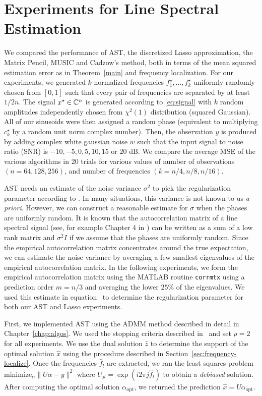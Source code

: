 
\section{Experiments for Line Spectral Estimation} %
\label{sec:ast:experiments}
We compared the performance of AST, the discretized Lasso approximation, the
Matrix Pencil, MUSIC and Cadzow's method, both in terms of the mean squared
estimation error as in Theorem~\ref{main} and frequency localization. For our
experiments, we generated $k$ normalized frequencies $f_1^\star, \ldots,
f_k^\star$ uniformly randomly chosen from $\left[0,1\right]$ such that every
pair of frequencies are separated by at least $1/2n$. The signal $x^\star \in
\mathbb{C}^n$ is generated according to \eqref{eq:signal} with $k$ random amplitudes
independently chosen from $\chi^2(1)$ distribution (squared Gaussian). All of
our sinusoids were then assigned a random phase (equivalent to multiplying
$c_k^\star$ by a random unit norm complex number). Then, the observation $y$ is
produced by adding complex white gaussian noise $w$ such that the input signal
to noise ratio (SNR) is $-10,-5,0,5,10,15$ or $20$ dB. We compare the average
MSE of the various algorithms in 20 trials for various values of number of
observations $(n = 64,128,256)$, and number of frequencies $ (k =
n/4,n/8,n/16)$.


AST needs an estimate of the noise variance $\sigma^2$ to pick the
regularization parameter according to . In many situations, this
variance is not known to us \emph{a priori}. However, we can construct a
reasonable estimate for $\sigma$ when the phases are uniformly random. It is
known that the autocorrelation matrix of a line spectral signal (see, for
example Chapter 4 in \cite{StoicaMoses}) can be written as a sum of a low rank
matrix and $\sigma^2 I$ if we assume that the phases are uniformly random. Since
the empirical autocorrelation matrix concentrates around the true expectation,
we can estimate the noise variance by averaging a few smallest eigenvalues of
the empirical autocorrelation matrix. In the following experiments, we form the
empirical autocorrelation matrix using the MATLAB routine \texttt{corrmtx} using
a prediction order $m=n/3$ and averaging the lower $25\%$ of the eigenvalues. We
used this estimate in equation~ to determine the regularization
parameter for both our AST and Lasso experiments.

First, we implemented AST using the ADMM method described in detail in
Chapter~\ref{chap:algos}. We used the stopping criteria described
in~\cite{admm2011} and set $\rho=2$ for all experiments. We use the dual
solution $\hat{z}$ to determine the support of the optimal solution $\hat{x}$
using the procedure described in Section~\ref{sec:frequency-localize}. Once the
frequencies $\hat{f}_l$ are extracted, we ran the least squares problem
$\mbox{minimize}_\alpha \|U \alpha - y\|^2$ where $U_{jl} = \exp(i 2\pi j
\hat{f}_l)$ to obtain a \emph{debiased} solution. After computing the optimal
solution $\alpha_{\mathrm{opt}}$, we returned the prediction $\hat{x} =
U\alpha_{\mathrm{opt}}$.

